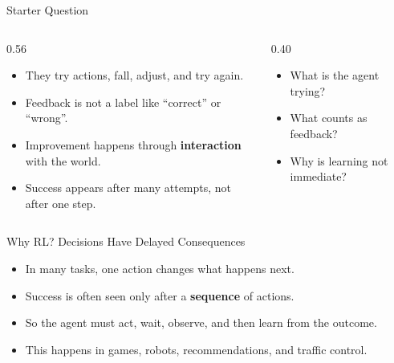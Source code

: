 \documentclass[aspectratio=169]{beamer}
\newcommand{\defaultdeckrefs}{AIMA4e Ch.22 pp.789--822; Poole3e Ch.13 pp.583--608}
\newcommand{\currentsliderefs}{\defaultdeckrefs}
\newcommand{\setslideref}[1]{\gdef\currentsliderefs{#1}}
\begin{document}
\setslideref{AIMA4e Ch.22 pp.789--822; Poole3e Ch.13 pp.583--608}
\begin{frame}{Starter Question}
\begin{columns}[T,onlytextwidth]
  \begin{column}{0.56\textwidth}
    \begin{itemize}
      \item They try actions, fall, adjust, and try again.
      \item Feedback is not a label like ``correct'' or ``wrong''.
      \item Improvement happens through \textbf{interaction} with the world.
      \item Success appears after many attempts, not after one step.
    \end{itemize}
  \end{column}
  \begin{column}{0.40\textwidth}
    \begin{tcolorbox}[colback=plainbg,colframe=plainframe,boxrule=0.7pt,title=Think Before We Formalise RL]
    \begin{itemize}
      \item What is the agent trying?
      \item What counts as feedback?
      \item Why is learning not immediate?
    \end{itemize}
    \end{tcolorbox}
  \end{column}
\end{columns}
\end{frame}

\setslideref{AIMA4e Ch.22 pp.789--822; Poole3e Ch.13 pp.583--608}
\begin{frame}{Why RL? Decisions Have Delayed Consequences}
\begin{itemize}
  \item In many tasks, one action changes what happens next.
  \item Success is often seen only after a \textbf{sequence} of actions.
  \item So the agent must act, wait, observe, and then learn from the outcome.
  \item This happens in games, robots, recommendations, and traffic control.
\end{itemize}
\end{frame}
\end{document}
